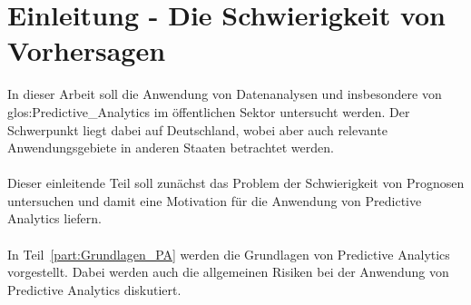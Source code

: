 \chapter{Einleitung - Die Schwierigkeit von Vorhersagen}

In dieser Arbeit soll die Anwendung von Datenanalysen und insbesondere
von \gls{glos:Predictive_Analytics} im öffentlichen Sektor untersucht werden.
Der Schwerpunkt liegt dabei auf Deutschland, wobei aber auch relevante
Anwendungsgebiete in anderen Staaten betrachtet werden. \\ \\
Dieser einleitende Teil soll zunächst das Problem der Schwierigkeit von
Prognosen untersuchen und damit eine Motivation für die Anwendung von Predictive
Analytics liefern. \\ \\
In Teil~\ref{part:Grundlagen_PA} werden die Grundlagen von Predictive Analytics
vorgestellt. Dabei werden auch die allgemeinen Risiken bei der Anwendung von
Predictive Analytics diskutiert. \\ \\
